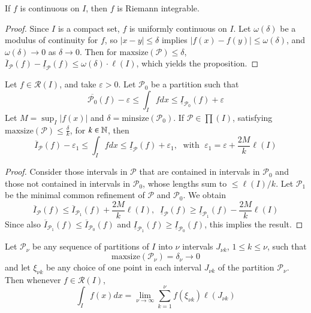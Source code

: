 \begin{proposition}
    If $f$ is continuous on $I$, then $f$ is Riemann integrable.
\end{proposition}
\begin{proof}
    Since $I$ is a compact set, $f$ is uniformly continuous on $I$. Let $\omega(\delta)$ be a modulus of continuity for $f$, so $|x-y| \leq \delta$ implies $|f(x)-f(y)|\leq \omega(\delta)$, and $\omega(\delta)\rightarrow 0$ as $\delta \rightarrow 0$. Then for $\text{maxsize}(\mathcal{P})\leq \delta$, $\overline{I}_{\mathcal{P}}(f) - \underline{I}_{\mathcal{P}}(f) \leq \omega(\delta)\cdot\ell(I)$, which yields the proposition.
\end{proof}

\begin{proposition}
    Let $f \in \mathcal{R}(I)$, and take $\varepsilon > 0$. Let $\mathcal{P}_0$ be a partition such that $$\overline{\mathcal{P}_0}(f) - \varepsilon \leq \int_Ifdx \leq \underline{I}_{\mathcal{P}_0}(f) + \varepsilon$$ Let $M = \sup_I|f(x)|$ and $\delta = \text{minsize}(\mathcal{P}_0)$. If $\mathcal{P} \in \prod(I)$, satisfying $\text{maxsize}(\mathcal{P}) \leq \frac{\delta}{k}$, for $k \in \mathbb N$, then $$\overline{I}_{\mathcal{P}}(f) - \varepsilon_1 \leq \int_Ifdx \leq \underline{I}_{\mathcal{P}}(f) + \varepsilon_1,\;\text{ with }\;\varepsilon_1 = \varepsilon + \frac{2M}{k}\ell(I)$$
\end{proposition}
\begin{proof}
    Consider those intervals in $\mathcal{P}$ that are contained in intervals in $\mathcal{P}_0$ and those not contained in intervals in $\mathcal{P}_0$, whose lengths sum to $\leq \ell(I)/k$. Let $\mathcal{P}_1$ be the minimal common refinement of $\mathcal{P}$ and $\mathcal{P}_0$. We obtain \begin{equation*}
        \overline{I}_{\mathcal{P}}(f) \leq \overline{I}_{\mathcal{P}_1}(f) +\frac{2M}{k}\ell(I),\;\;\underline{I}_{\mathcal{P}}(f) \geq \underline{I}_{\mathcal{P}_1}(f) - \frac{2M}{k}\ell(I)
    \end{equation*}
    Since also $\overline{I}_{\mathcal{P}_1}(f) \leq \overline{I}_{\mathcal{P}_0}(f)$ and $\underline{I}_{\mathcal{P}_1}(f) \geq \underline{I}_{\mathcal{P}_0}(f)$, this implies the result.
\end{proof}

\begin{corollary}
    Let $\mathcal{P}_\nu$ be any sequence of partitions of $I$ into $\nu$ intervals $J_{\nu k}$, $1 \leq k \leq \nu$, such that $$\text{maxsize}(\mathcal{P}_\nu) = \delta_\nu\rightarrow 0$$
    and let $\xi_{\nu k}$ be any choice of one point in each interval $J_{\nu k}$ of the partition $\mathcal{P}_\nu$. Then whenever $f \in \mathcal{R}(I)$, $$\int_If(x)dx = \lim\limits_{\nu\rightarrow \infty}\sum_{k=1}^\nu f(\xi_{\nu k})\ell(J_{\nu k})$$
\end{corollary}

